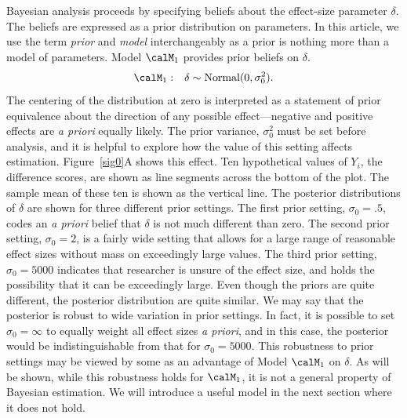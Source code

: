 Bayesian analysis proceeds by specifying beliefs about the effect-size parameter $\delta$.  The beliefs are expressed as a prior distribution on parameters.  In this article, we use the term {\em prior} and {\em model} interchangeably as a prior is nothing more than a model of parameters.  Model $\calM_1$ provides prior beliefs on $\delta$.
\begin{eqnarray} \label{M1}
\calM_1: &&\delta \sim \mbox{Normal}(0,\sigma_0^2).
\end{eqnarray}
The centering of the distribution at zero is interpreted as a statement of prior equivalence about the direction of any possible effect---negative and positive effects are {\em a priori} equally likely.  The prior variance, $\sigma_0^2$ must be set before analysis, and it is helpful to explore how the value of this setting affects estimation.  Figure~\ref{sig0}A shows this effect.  Ten hypothetical values of $Y_i$, the difference scores, are shown as line segments across the bottom of the plot.  The sample mean of these ten is shown as the vertical line.   The posterior distributions of $\delta$ are shown for three different prior settings.  The first prior setting, $\sigma_0=.5$, codes an {\em a priori} belief that $\delta$ is not much different than zero.  The second prior setting, $\sigma_0=2$, is a fairly wide setting that allows for a large range of reasonable effect sizes without mass on exceedingly large values.  The third prior setting, $\sigma_0=5000$ indicates that researcher is unsure of the effect size, and holds the possibility that it can be exceedingly large.   Even though the priors are quite different, the posterior distribution are quite similar.   We may say that the posterior is robust to wide variation in prior settings.  In fact, it is possible to set $\sigma_0=\infty$ to equally weight all effect sizes {\em a priori},  and in this case, the posterior would be indistinguishable from that for $\sigma_0=5000$.  This robustness to prior settings may be viewed by some as an advantage of Model $\calM_1$ on  $\delta$.  As will be shown, while this robustness holds for $\calM_1$, it is not a general property of Bayesian estimation.  We will introduce a useful model in the next section where it does not hold.

